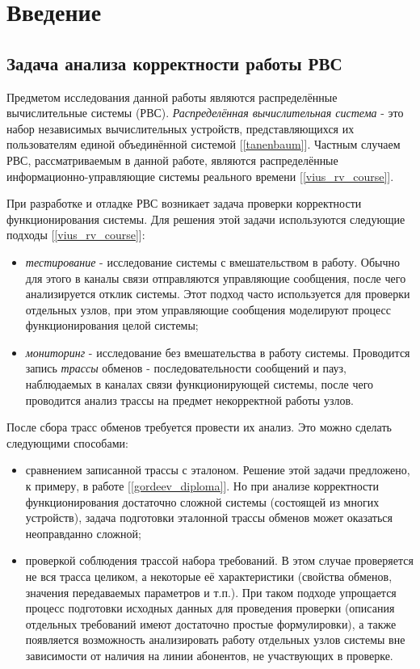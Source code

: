 \section{Введение}

\subsection{Задача анализа корректности работы РВС}

Предметом исследования данной работы являются распределённые вычислительные 
системы (РВС). \textit{Распределённая вычислительная система} - это 
набор независимых вычислительных устройств, представляющихся их 
пользователям единой объединённой системой [\ref{tanenbaum}]. Частным случаем 
РВС, рассматриваемым в данной работе, являются распределённые 
информационно-управляющие системы реального времени [\ref{vius_rv_course}].

При разработке и отладке РВС возникает задача проверки корректности 
функционирования системы. Для решения этой задачи используются следующие 
подходы [\ref{vius_rv_course}]:

\begin{itemize}
 \item \textit{тестирование} - исследование системы с вмешательством в работу.
Обычно для этого в каналы связи отправляются управляющие сообщения, 
после чего анализируется отклик системы. Этот подход часто используется для 
проверки отдельных узлов, при этом управляющие сообщения моделируют 
процесс функционирования целой системы;
 \item \textit{мониторинг} - исследование без вмешательства в работу системы. 
Проводится запись \textit{трассы} обменов - последовательности сообщений и 
пауз, наблюдаемых в каналах связи функционирующей системы, после чего 
проводится анализ трассы на предмет некорректной работы узлов.
\end{itemize}

После сбора трасс обменов требуется провести их анализ. Это можно сделать 
следующими способами:

\begin{itemize}
 \item сравнением записанной трассы с эталоном. Решение этой задачи предложено, 
к примеру, в работе [\ref{gordeev_diploma}]. Но при анализе корректности 
функционирования достаточно сложной системы (состоящей из многих 
устройств), задача подготовки эталонной трассы обменов может оказаться 
неоправданно сложной;
 \item проверкой соблюдения трассой набора требований. В этом случае 
проверяется не вся трасса целиком, а некоторые её характеристики (свойства 
обменов, значения передаваемых параметров и т.п.). При таком подходе упрощается 
процесс подготовки исходных данных для проведения проверки (описания отдельных 
требований имеют достаточно простые формулировки), а также появляется 
возможность анализировать работу отдельных узлов системы вне зависимости от 
наличия на линии абонентов, не участвующих в проверке.
\end{itemize}

